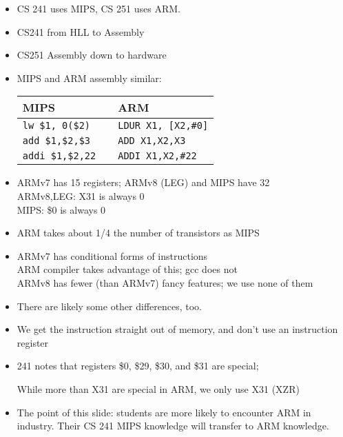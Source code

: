 \begin{frame}[fragile]
\begin{itemize}
\item CS 241 uses MIPS, CS 251 uses ARM.
\item CS241 from HLL to Assembly
\item CS251 Assembly down to hardware

	\item MIPS and ARM assembly similar:
	\begin{center}
	\begin{tabular}{lcl}
	{\bf MIPS} & &{\bf ARM}\\\hline
	\texttt{lw \$1, 0(\$2)} && \texttt{LDUR X1, [X2,\#0]} \\
	\texttt{add \$1,\$2,\$3} && \texttt{ADD X1,X2,X3}\\
	\texttt{addi \$1,\$2,22} && \texttt{ADDI X1,X2,\#22}\\
	\end{tabular}
	\end{center}
	\item ARMv7 has 15 registers; ARMv8 (LEG) and MIPS have 32\\

		ARMv8,LEG: X31 is always 0\\

		MIPS: \$0 is always 0
	\item ARM takes about 1/4 the number of transistors as MIPS
	\item ARMv7 has conditional forms of instructions \\

		ARM compiler takes advantage of this; gcc does not\\

               ARMv8 has fewer (than ARMv7) fancy features; we use none of them



\end{itemize}
\BNotes\ifnum{}
\begin{itemize}
 \item There are likely some other differences, too.
 \item We get the instruction straight out of memory, and don't use an
	instruction register
 \item 241 notes that registers \$0, \$29, \$30, and \$31 are special;

	While more than X31 are special in ARM, we only use X31 (XZR)
 \item The point of this slide: students are more likely to encounter
	ARM in industry.  Their CS 241 MIPS knowledge will transfer to ARM knowledge.
	

\end{itemize}
\end{frame}
